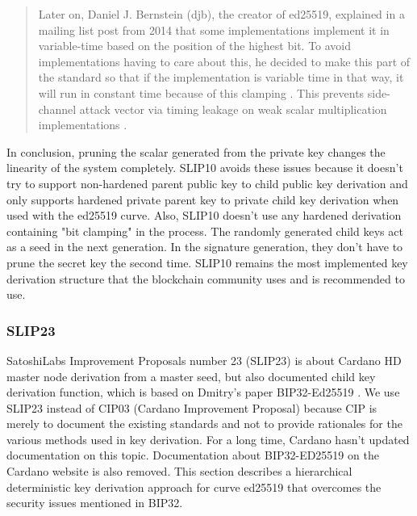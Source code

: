 \begin{adjustwidth}{1cm}{}
\begin{itemize}
\begin{quote}
                  Later on, Daniel J. Bernstein (djb), the creator of ed25519, explained in a mailing list post from 2014 that some implementations implement it in variable-time based on the position of the highest bit. To avoid implementations having to care about this, he decided to make this part of the standard so that if the implementation is variable time in that way, it will run in constant time because of this clamping \cite{Bernstein:2014}. This prevents side-channel attack vector via timing leakage on weak scalar multiplication implementations \cite{DBLP:journals/iacr/BrumleyT11}.

              \end{quote}

    \end{itemize}
    In conclusion, pruning the scalar generated from the private key changes the linearity of the system completely. SLIP10 avoids these issues because it doesn't try to support non-hardened parent public key to child public key derivation and only supports hardened private parent key to private child key derivation when used with the ed25519 curve. Also, SLIP10 doesn't use any hardened derivation containing "bit clamping" in the process. The randomly generated child keys act as a seed in the next generation. In the signature generation, they don't have to prune the secret key the second time. SLIP10 remains the most implemented key derivation structure that the blockchain community uses and is recommended to use.

\end{adjustwidth}


\subsubsection{SLIP23}
\label{bip32ed25519}

SatoshiLabs Improvement Proposals number 23 (SLIP23) is about Cardano HD master node derivation from a master seed, but also documented child key derivation function, which is based on Dmitry’s paper BIP32-Ed25519 \cite{Khovratovich2017}. We use SLIP23 instead of CIP03 (Cardano Improvement Proposal) because CIP is merely to document the existing standards and not to provide rationales for the various methods used in key derivation. For a long time, Cardano hasn’t updated documentation on this topic. Documentation about BIP32-ED25519 on the Cardano website is also removed. This section describes a hierarchical deterministic key derivation approach for curve ed25519 that overcomes the security issues mentioned in BIP32.

